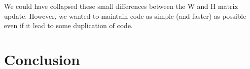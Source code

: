 \documentclass[a4paper,12pt]{article}
\begin{document}
We could have collapsed these small differences between the W and H matrix update.
However, we wanted to maintain code as simple (and faster) as possible even if it lead to some duplication of code.



\section{Conclusion}
\label{conclusion}


\nocite{*}




\end{document}
